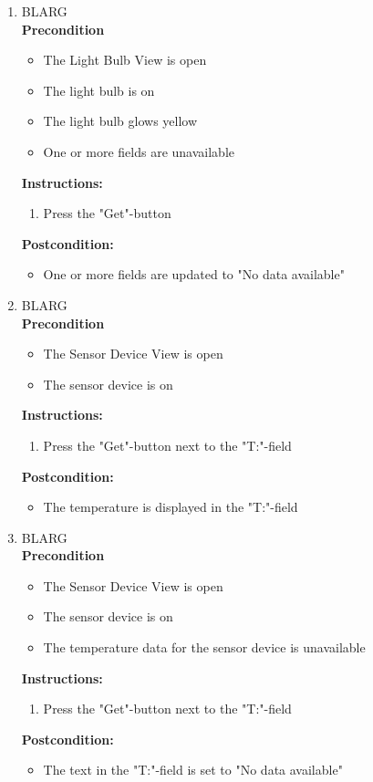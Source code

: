 \documentclass[a4paper]{article}
\newlength{\testlabellength}
\newenvironment{testlist}{\begin{enumerate}[label=\bfseries Instruction \thesubsection.\arabic* , labelindent=0pt, labelwidth=\testlabellength , leftmargin=2cm]}{\end{enumerate}}
\newenvironment{precondition}{
{\color{white}BLARG}\\ 
\textbf{Precondition}
\begin{itemize}[labelindent=0cm, labelwidth=2cm , leftmargin=1cm]
}
{\end{itemize}}
\newenvironment{instruction}{
\textbf{Instructions:}
\begin{enumerate}[label=\bfseries  \arabic*., labelindent=0cm, labelwidth=2cm , leftmargin=1cm]
}
{\end{enumerate}}
\newenvironment{postcondition}{
\textbf{Postcondition:}
\begin{itemize}[labelindent=0cm, labelwidth=2cm , leftmargin=1cm]
}
{\end{itemize}}
\begin{document}
\begin{appendices}
\begin{testlist}
	\item
		\begin{precondition}
			\item The Light Bulb View is open
			\item The light bulb is on
			\item The light bulb glows yellow
			\item One or more fields are unavailable
		\end{precondition}
		\begin{instruction}
			\item Press the "Get"-button
		\end{instruction}
		\begin{postcondition}
			\item One or more fields are updated to "No data available"
		\end{postcondition}

	\item
		\begin{precondition}
			\item The Sensor Device View is open
			\item The sensor device is on
		\end{precondition}
		\begin{instruction}
			\item Press the "Get"-button next to the "T:"-field
		\end{instruction}
		\begin{postcondition}
			\item The temperature is displayed in the "T:"-field
		\end{postcondition}

	\item
		\begin{precondition}
			\item The Sensor Device View is open
			\item The sensor device is on
			\item The temperature data for the sensor device is unavailable
		\end{precondition}
		\begin{instruction}
			\item Press the "Get"-button next to the "T:"-field
		\end{instruction}
		\begin{postcondition}
			\item The text in the "T:"-field is set to "No data available"
		\end{postcondition}
        

\end{testlist}
\end{appendices}
\end{document}
